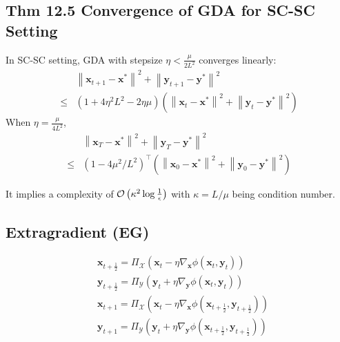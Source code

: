\subsection*{Thm 12.5 Convergence of GDA for SC-SC Setting}
In SC-SC setting, GDA with stepsize $\eta<\frac{\mu}{2 L^{2}}$ converges linearly:
$$
\begin{aligned}
&\left\|\mathbf{x}_{t+1}-\mathbf{x}^{*}\right\|^{2}+\left\|\mathbf{y}_{t+1}-\mathbf{y}^{*}\right\|^{2} \\
\leq &\left(1+4 \eta^{2} L^{2}-2 \eta \mu\right)\left(\left\|\mathbf{x}_{t}-\mathbf{x}^{*}\right\|^{2}+\left\|\mathbf{y}_{t}-\mathbf{y}^{*}\right\|^{2}\right)
\end{aligned}
$$
When $\eta=\frac{\mu}{4 L^{2}}$,
$$
\begin{aligned}
&\left\|\mathbf{x}_{T}-\mathbf{x}^{*}\right\|^{2}+\left\|\mathbf{y}_{T}-\mathbf{y}^{*}\right\|^{2} \\
\leq &\left(1-4 \mu^{2} / L^{2}\right)^{\top}\left(\left\|\mathbf{x}_{0}-\mathbf{x}^{*}\right\|^{2}+\left\|\mathbf{y}_{0}-\mathbf{y}^{*}\right\|^{2}\right)
\end{aligned}
$$

It implies a complexity of $\operatorname{\mathcal{O}}\left(\kappa^{2} \log \frac{1}{\epsilon}\right)$ with $\kappa=L / \mu$ being condition number.






\subsection*{Extragradient (EG)}
$$
\begin{aligned}
&\mathbf{x}_{t+\frac{1}{2}}=\Pi_{\mathcal{X}}\left(\mathbf{x}_{t}-\eta \nabla_{\mathbf{x}} \phi\left(\mathbf{x}_{t}, \mathbf{y}_{t}\right)\right) \\
&\mathbf{y}_{t+\frac{1}{2}}=\Pi_{\mathcal{Y}}\left(\mathbf{y}_{t}+\eta \nabla_{\mathbf{y}} \phi\left(\mathbf{x}_{t}, \mathbf{y}_{t}\right)\right) \\
&\mathbf{x}_{t+1}=\Pi_{\mathcal{X}}\left(\mathbf{x}_{t}-\eta \nabla_{\mathbf{x}} \phi\left(\mathbf{x}_{t+\frac{1}{2}}, \mathbf{y}_{t+\frac{1}{2}}\right)\right) \\
&\mathbf{y}_{t+1}=\Pi_{\mathcal{Y}}\left(\mathbf{y}_{t}+\eta \nabla_{\mathbf{y}} \phi\left(\mathbf{x}_{t+\frac{1}{2}}, \mathbf{y}_{t+\frac{1}{2}}\right)\right)
\end{aligned}
$$





